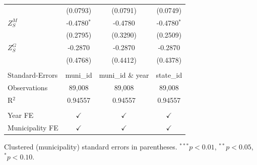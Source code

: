 \begin{tabular}{lccc}
                   & (0.0793)        & (0.0791)           & (0.0749)\\   
   $Z^{M}_S$       & -0.4780$^{*}$   & -0.4780            & -0.4780$^{*}$\\   
                   & (0.2795)        & (0.3290)           & (0.2509)\\   
   $Z^{G}_S$       & -0.2870         & -0.2870            & -0.2870\\   
                   & (0.4768)        & (0.4412)           & (0.4378)\\   
    \\
   Standard-Errors & muni\_id        & muni\_id \& year   & state\_id \\    
   Observations    & 89,008          & 89,008             & 89,008\\  
   R$^2$           & 0.94557         & 0.94557            & 0.94557\\  
    \\
   Year FE         & $\checkmark$    & $\checkmark$       & $\checkmark$\\   
   Municipality FE & $\checkmark$    & $\checkmark$       & $\checkmark$\\   
   \bottomrule
\end{tabular}
 
\par \raggedright 
Clustered (municipality) standard errors in parentheses. $^{***}p<0.01$, $^{**}p<0.05$, $^{*}p<0.10$.
\par\endgroup

